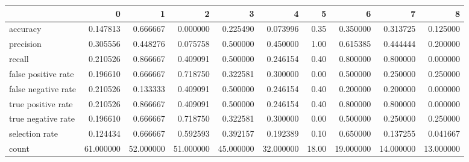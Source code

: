 \begin{tabular}{lrrrrrrrrr}
\toprule
{} &          0 &          1 &          2 &          3 &          4 &      5 &          6 &          7 &          8 \\
\midrule
accuracy            &   0.147813 &   0.666667 &   0.000000 &   0.225490 &   0.073996 &   0.35 &   0.350000 &   0.313725 &   0.125000 \\
precision           &   0.305556 &   0.448276 &   0.075758 &   0.500000 &   0.450000 &   1.00 &   0.615385 &   0.444444 &   0.200000 \\
recall              &   0.210526 &   0.866667 &   0.409091 &   0.500000 &   0.246154 &   0.40 &   0.800000 &   0.800000 &   0.000000 \\
false positive rate &   0.196610 &   0.666667 &   0.718750 &   0.322581 &   0.300000 &   0.00 &   0.500000 &   0.250000 &   0.250000 \\
false negative rate &   0.210526 &   0.133333 &   0.409091 &   0.500000 &   0.246154 &   0.40 &   0.200000 &   0.200000 &   0.000000 \\
true positive rate  &   0.210526 &   0.866667 &   0.409091 &   0.500000 &   0.246154 &   0.40 &   0.800000 &   0.800000 &   0.000000 \\
true negative rate  &   0.196610 &   0.666667 &   0.718750 &   0.322581 &   0.300000 &   0.00 &   0.500000 &   0.250000 &   0.250000 \\
selection rate      &   0.124434 &   0.666667 &   0.592593 &   0.392157 &   0.192389 &   0.10 &   0.650000 &   0.137255 &   0.041667 \\
count               &  61.000000 &  52.000000 &  51.000000 &  45.000000 &  32.000000 &  18.00 &  19.000000 &  14.000000 &  13.000000 \\
\bottomrule
\end{tabular}

